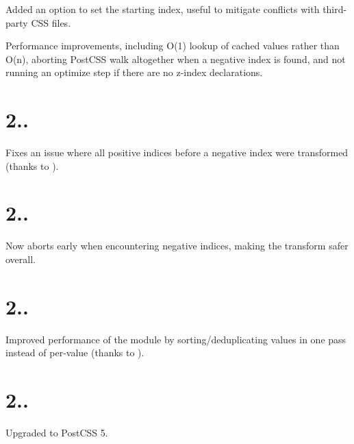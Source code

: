 
\begin{DoxyItemize}
\item Added an option to set the starting index, useful to mitigate conflicts with third-\/party C\+SS files.
\item Performance improvements, including O(1) lookup of cached values rather than O(n), aborting Post\+C\+SS walk altogether when a negative index is found, and not running an optimize step if there are no z-\/index declarations.
\end{DoxyItemize}

\section*{2..}


\begin{DoxyItemize}
\item Fixes an issue where all positive indices before a negative index were transformed (thanks to ).
\end{DoxyItemize}

\section*{2..}


\begin{DoxyItemize}
\item Now aborts early when encountering negative indices, making the transform safer overall.
\end{DoxyItemize}

\section*{2..}


\begin{DoxyItemize}
\item Improved performance of the module by sorting/deduplicating values in one pass instead of per-\/value (thanks to ).
\end{DoxyItemize}

\section*{2..}


\begin{DoxyItemize}
\item Upgraded to Post\+C\+SS 5.
\end{DoxyItemize}

